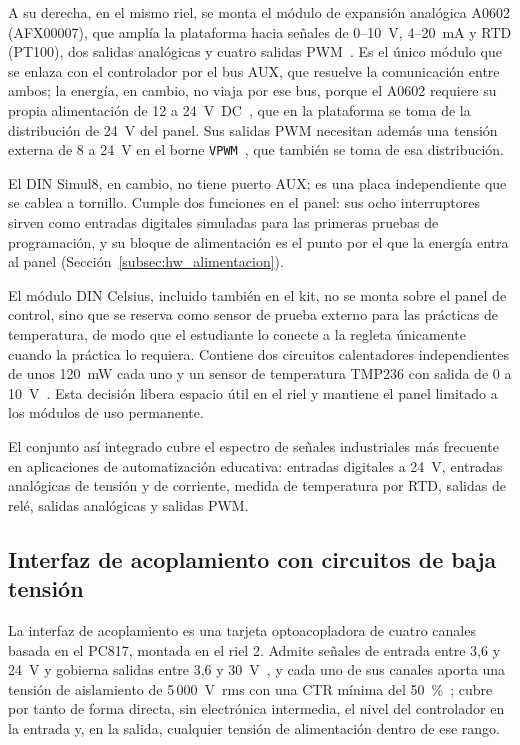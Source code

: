 \documentclass[12pt,a4paper,oneside]{report}
\begin{document}
A su derecha, en el mismo riel, se monta el módulo de expansión analógica A0602 (AFX00007), que amplía la plataforma hacia señales de 0--10~V, 4--20~mA y RTD (PT100), dos salidas analógicas y cuatro salidas PWM~\cite{ref35}. Es el único módulo que se enlaza con el controlador por el bus AUX, que resuelve la comunicación entre ambos; la energía, en cambio, no viaja por ese bus, porque el A0602 requiere su propia alimentación de 12 a 24~V~DC~\cite{ref35}, que en la plataforma se toma de la distribución de 24~V del panel. Sus salidas PWM necesitan además una tensión externa de 8 a 24~V en el borne \texttt{VPWM}~\cite{ref35}, que también se toma de esa distribución.

El DIN Simul8, en cambio, no tiene puerto AUX; es una placa independiente que se cablea a tornillo. Cumple dos funciones en el panel: sus ocho interruptores sirven como entradas digitales simuladas para las primeras pruebas de programación, y su bloque de alimentación es el punto por el que la energía entra al panel (Sección~\ref{subsec:hw_alimentacion}).

El módulo DIN Celsius, incluido también en el kit, no se monta sobre el panel de control, sino que se reserva como sensor de prueba externo para las prácticas de temperatura, de modo que el estudiante lo conecte a la regleta únicamente cuando la práctica lo requiera. Contiene dos circuitos calentadores independientes de unos 120~mW cada uno y un sensor de temperatura TMP236 con salida de 0 a 10~V~\cite{ref37}. Esta decisión libera espacio útil en el riel y mantiene el panel limitado a los módulos de uso permanente.

El conjunto así integrado cubre el espectro de señales industriales más frecuente en aplicaciones de automatización educativa: entradas digitales a 24~V, entradas analógicas de tensión y de corriente, medida de temperatura por RTD, salidas de relé, salidas analógicas y salidas PWM.

\subsection{Interfaz de acoplamiento con circuitos de baja tensión}
\label{subsec:hw_opto}

La interfaz de acoplamiento es una tarjeta optoacopladora de cuatro canales basada en el PC817, montada en el riel 2. Admite señales de entrada entre 3,6 y 24~V y gobierna salidas entre 3,6 y 30~V~\cite{ref13}, y cada uno de sus canales aporta una tensión de aislamiento de 5\,000~V~rms con una CTR mínima del 50~\%~\cite{ref14}; cubre por tanto de forma directa, sin electrónica intermedia, el nivel del controlador en la entrada y, en la salida, cualquier tensión de alimentación dentro de ese rango.
\end{document}
